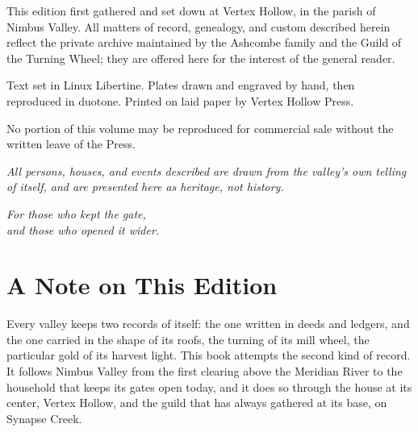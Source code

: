 \documentclass[11pt,twoside]{book}
\begin{document}
\thispagestyle{empty}
\vspace*{1.6in}
\begin{center}
\begin{minipage}{0.78\textwidth}
\small\color{heritageCharcoal}
This edition first gathered and set down at Vertex Hollow, in the parish of Nimbus Valley. All matters of record, genealogy, and custom described herein reflect the private archive maintained by the Ashcombe family and the Guild of the Turning Wheel; they are offered here for the interest of the general reader.

\vspace{10pt}
Text set in Linux Libertine. Plates drawn and engraved by hand, then reproduced in duotone. Printed on laid paper by Vertex Hollow Press.

\vspace{10pt}
No portion of this volume may be reproduced for commercial sale without the written leave of the Press.

\vspace{10pt}
\itshape All persons, houses, and events described are drawn from the valley's own telling of itself, and are presented here as heritage, not history.
\end{minipage}
\end{center}
\clearpage

\thispagestyle{empty}
\vspace*{2.3in}
\begin{center}
\begin{minipage}{0.65\textwidth}
\centering
\itshape\color{heritageGreen}\fontsize{13}{16}\selectfont
For those who kept the gate,\\ and those who opened it wider.
\end{minipage}
\end{center}
\clearpage

\chapter*{A Note on This Edition}
\thispagestyle{plain}
\noindent Every valley keeps two records of itself: the one written in deeds and ledgers, and the one carried in the shape of its roofs, the turning of its mill wheel, the particular gold of its harvest light. This book attempts the second kind of record. It follows Nimbus Valley from the first clearing above the Meridian River to the household that keeps its gates open today, and it does so through the house at its center, Vertex Hollow, and the guild that has always gathered at its base, on Synapse Creek.
\end{document}
